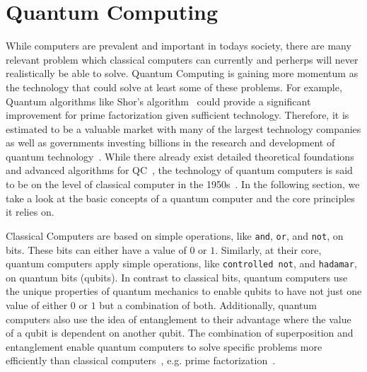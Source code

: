 \section{Quantum Computing}
While computers are prevalent and important in todays society, there are many relevant problem which classical computers can currently and perherps will never realistically be able to solve. Quantum Computing is gaining more momentum as the technology that could solve at least some of these problems. For example, Quantum algorithms like Shor's algorithm~\cite{Shor97} could provide a significant improvement for prime factorization given sufficient technology. Therefore, it is estimated to be a valuable market with many of the largest technology companies as well as governments investing billions in the research and development of quantum technology~\cite{RDB*22}. While there already exist detailed theoretical foundations~\cite{van20, Ying11,YYF12} and advanced algorithms for QC~\cite{ACR*10,BGB*18,LoCh19,Shor97}, the technology of quantum computers is said to be on the level of classical computer in the 1950s~\cite{CFM17}. In the following section, we take a look at the basic concepts of a quantum computer and the core principles it relies on.

Classical Computers are based on simple operations, like \texttt{and}, \texttt{or}, and \texttt{not}, on bits. These bits can either have a value of $0$ or $1$. Similarly, at their core, quantum computers apply simple operations, like \texttt{controlled not}, and \texttt{hadamar}, on quantum bits (qubits). In contrast to classical bits, quantum computers use the unique properties of quantum mechanics to enable qubits to have not just one value of either $0$ or $1$ but a combination of both. Additionally, quantum computers also use the idea of entanglement to their advantage where the value of a qubit is dependent on another qubit. The combination of superposition and entanglement enable quantum computers to solve specific problems more efficiently than classical computers~\cite{RDB*22}, e.g. prime factorization~\cite{Shor97}.

